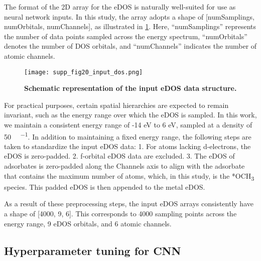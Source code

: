 The format of the 2D array for the eDOS is naturally well-suited for use as neural network inputs.
In this study, the array adopts a shape of [numSamplings, numOrbitals, numChannels], as illustrated in \cref{supp_fig20:input_dos}.
Here, ``numSamplings'' represents the number of data points sampled across the energy spectrum,
``numOrbitals'' denotes the number of DOS orbitals,
and ``numChannels'' indicates the number of atomic channels.

\begin{figure}[htbp]
  \centering
  \texttt{[image: supp\_fig20\_input\_dos.png]}
  \caption{\textbf{Schematic representation of the input eDOS data structure.}}
  \label{supp_fig20:input_dos}
\end{figure}

For practical purposes, certain spatial hierarchies are expected to remain invariant,
such as the energy range over which the eDOS is sampled.
In this work, we maintain a consistent energy range of -14 eV to 6 eV,
sampled at a density of 50 \si{ \cdot {}^{-1}}.
In addition to maintaining a fixed energy range,
the following steps are taken to standardize the input eDOS data:
  1.	For atoms lacking d-electrons, the eDOS is zero-padded.
  2.	f-orbital eDOS data are excluded.
  3.	The eDOS of adsorbates is zero-padded along the Channels axis to align with the adsorbate that contains the maximum number of atoms, which, in this study, is the *OCH\textsubscript{3} species. This padded eDOS is then appended to the metal eDOS.

As a result of these preprocessing steps, the input eDOS arrays consistently have a shape of [4000, 9, 6].
This corresponds to 4000 sampling points across the energy range, 9 eDOS orbitals, and 6 atomic channels.

\subsection{Hyperparameter tuning for CNN}
\label{supp_sec3.4_hyperparam}

